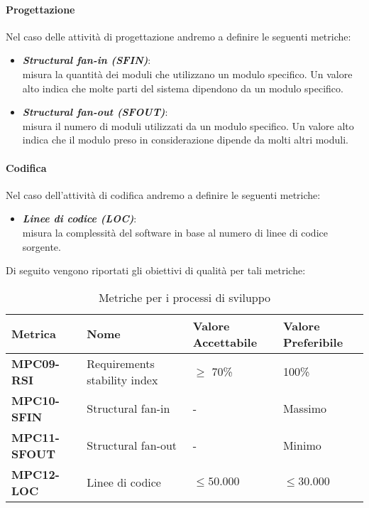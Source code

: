\paragraph{Progettazione}
Nel caso delle attività di progettazione andremo a definire le seguenti metriche:
\begin{itemize}
    \item \textbf{\emph{Structural fan-in (SFIN)}}:\\
    misura la quantità dei moduli che utilizzano un modulo specifico. Un valore alto indica che molte parti del sistema dipendono da un modulo specifico.
    \item \textbf{\emph{Structural fan-out (SFOUT)}}:\\
    misura il numero di moduli utilizzati da un modulo specifico. Un valore alto indica che il modulo preso in considerazione dipende da molti altri moduli.
\end{itemize}

\paragraph{Codifica}
Nel caso dell'attività di codifica andremo a definire le seguenti metriche:
\begin{itemize}
    \item \textbf{\emph{Linee di codice (LOC)}}:\\
    misura la complessità del software in base al numero di linee di codice sorgente.\\  
\end{itemize}
\newpage
Di seguito vengono riportati gli obiettivi di qualità per tali metriche:
\begin{table}[htbp]
    \centering
    \begin{tabular}{|>{\centering\arraybackslash}p{3.5cm}|p{4.3cm}|p{4cm}|p{4cm}|}
    \hline
    \rowcolor{gray!30}
    \textbf{Metrica} & \textbf{Nome} & \textbf{Valore Accettabile} & \textbf{Valore Preferibile} \\
    \hline
    \rowcolor{gray!10}
    \textbf{MPC09-RSI} & Requirements stability index & $\geq$ 70\% & 100\% \\
    \hline
    \rowcolor{gray!10}
    \textbf{MPC10-SFIN} & Structural fan-in & - & Massimo \\
    \hline
    \rowcolor{gray!10}
    \textbf{MPC11-SFOUT} & Structural fan-out & - & Minimo \\
    \hline
    \rowcolor{gray!10}
    \textbf{MPC12-LOC} & Linee di codice & $\leq 50.000 $ & $\leq 30.000$ \\
    \hline
    \end{tabular}
    \caption{Metriche per i processi di sviluppo}
    \label{tab:metriche_sviluppo}
\end{table}


